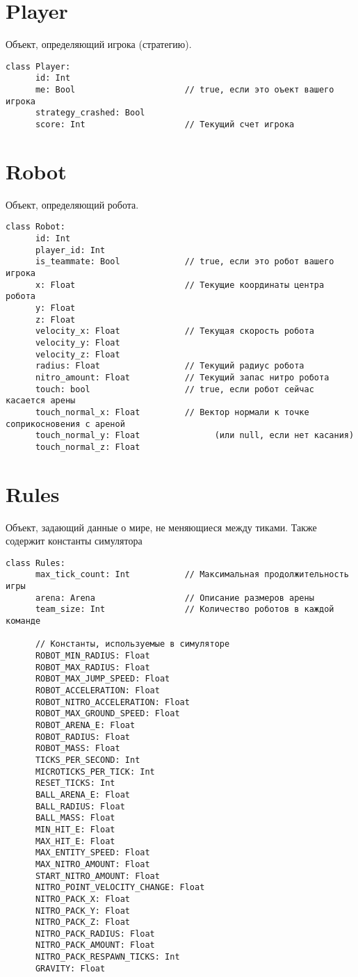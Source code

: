 \section{Player}

Объект, определяющий игрока (стратегию).

\begin{verbatim}
class Player:
      id: Int
      me: Bool                      // true, если это оъект вашего игрока
      strategy_crashed: Bool
      score: Int                    // Текущий счет игрока
\end{verbatim}

\section{Robot}

Объект, определяющий робота.

\begin{verbatim}
class Robot:
      id: Int
      player_id: Int
      is_teammate: Bool             // true, если это робот вашего игрока
      x: Float                      // Текущие координаты центра робота
      y: Float
      z: Float
      velocity_x: Float             // Текущая скорость робота
      velocity_y: Float
      velocity_z: Float
      radius: Float                 // Текущий радиус робота
      nitro_amount: Float           // Текущий запас нитро робота
      touch: bool                   // true, если робот сейчас касается арены
      touch_normal_x: Float         // Вектор нормали к точке соприкосновения с ареной
      touch_normal_y: Float               (или null, если нет касания)
      touch_normal_z: Float
\end{verbatim}

\section{Rules}

Объект, задающий данные о мире, не меняющиеся между тиками. Также содержит константы симулятора

\begin{verbatim}
class Rules:
      max_tick_count: Int           // Максимальная продолжительность игры
      arena: Arena                  // Описание размеров арены
      team_size: Int                // Количество роботов в каждой команде

      // Константы, используемые в симуляторе
      ROBOT_MIN_RADIUS: Float
      ROBOT_MAX_RADIUS: Float
      ROBOT_MAX_JUMP_SPEED: Float
      ROBOT_ACCELERATION: Float
      ROBOT_NITRO_ACCELERATION: Float
      ROBOT_MAX_GROUND_SPEED: Float
      ROBOT_ARENA_E: Float
      ROBOT_RADIUS: Float
      ROBOT_MASS: Float
      TICKS_PER_SECOND: Int
      MICROTICKS_PER_TICK: Int
      RESET_TICKS: Int
      BALL_ARENA_E: Float
      BALL_RADIUS: Float
      BALL_MASS: Float
      MIN_HIT_E: Float
      MAX_HIT_E: Float
      MAX_ENTITY_SPEED: Float
      MAX_NITRO_AMOUNT: Float
      START_NITRO_AMOUNT: Float
      NITRO_POINT_VELOCITY_CHANGE: Float
      NITRO_PACK_X: Float
      NITRO_PACK_Y: Float
      NITRO_PACK_Z: Float
      NITRO_PACK_RADIUS: Float
      NITRO_PACK_AMOUNT: Float
      NITRO_PACK_RESPAWN_TICKS: Int
      GRAVITY: Float
\end{verbatim}